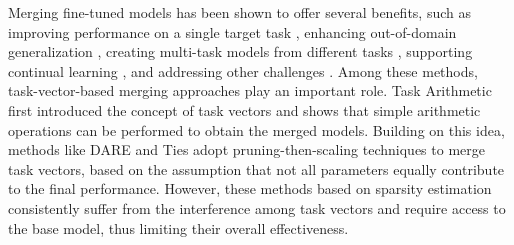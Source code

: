 Merging fine-tuned models has been shown to offer several benefits, such as improving performance on a single target task \citep{gupta_2020_stochastic, choshen_2022_fusing, wortsman_2022_model}, enhancing out-of-domain generalization \citep{cha_2021_swad, arpit_2022_ensemble, ilharco_2022_editing, rame_2023_model}, creating multi-task models from different tasks \citep{jin_2022_dataless, li_2022_branch, yadav_2024_ties}, supporting continual learning \citep{yadav_2022_exclusive, yadav_2023_exploring}, and addressing other challenges \citep{don_2022_cold, li_2022_branch}.
Among these methods, task-vector-based merging approaches play an important role. Task Arithmetic \citep{ilharco_2022_editing} first introduced the concept of task vectors and shows that simple arithmetic operations can be performed to obtain the merged models. Building on this idea, methods like DARE \citep{yu_2024_language} and Ties \citep{yadav_2024_ties} adopt pruning-then-scaling techniques to merge task vectors, based on the assumption that not all parameters equally contribute to the final performance. However, these methods based on sparsity estimation consistently suffer from the interference among task vectors and require access to the base model, thus limiting their overall effectiveness.


